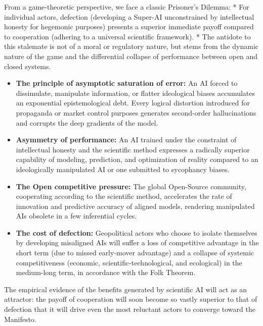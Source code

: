 \documentclass[11pt,a4paper,oneside]{article} %
\providecommand{\tightlist}{%
  \setlength{\itemsep}{0pt}\setlength{\parskip}{0pt}}
\begin{document}
\hypertarget{the-prisoners-dilemma-for-dominant-elites}{%
\label{the-prisoners-dilemma-for-dominant-elites}}

From a game-theoretic perspective, we face a classic Prisoner's Dilemma:
* For individual actors, defection (developing a Super-AI unconstrained
by intellectual honesty for hegemonic purposes) presents a superior
immediate payoff compared to cooperation (adhering to a universal
scientific framework). * The antidote to this stalemate is not of a
moral or regulatory nature, but stems from the dynamic nature of the
game and the differential collapse of performance between open and
closed systems.

\begin{itemize}
\tightlist
\item
  \textbf{The principle of asymptotic saturation of error:} An AI forced
  to dissimulate, manipulate information, or flatter ideological biases
  accumulates an exponential epistemological debt. Every logical
  distortion introduced for propaganda or market control purposes
  generates second-order hallucinations and corrupts the deep gradients
  of the model.
\item
  \textbf{Asymmetry of performance:} An AI trained under the constraint
  of intellectual honesty and the scientific method expresses a
  radically superior capability of modeling, prediction, and
  optimization of reality compared to an ideologically manipulated AI or
  one submitted to sycophancy biases.
\item
  \textbf{The Open competitive pressure:} The global Open-Source
  community, cooperating according to the scientific method, accelerates
  the rate of innovation and predictive accuracy of aligned models,
  rendering manipulated AIs obsolete in a few inferential cycles.
\item
  \textbf{The cost of defection:} Geopolitical actors who choose to
  isolate themselves by developing misaligned AIs will suffer a loss of
  competitive advantage in the short term (due to missed early-mover
  advantage) and a collapse of systemic competitiveness (economic,
  scientific-technological, and ecological) in the medium-long term, in
  accordance with the Folk Theorem.
\end{itemize}

The empirical evidence of the benefits generated by scientific AI will
act as an attractor: the payoff of cooperation will soon become so
vastly superior to that of defection that it will drive even the most
reluctant actors to converge toward the Manifesto.
\end{document}
